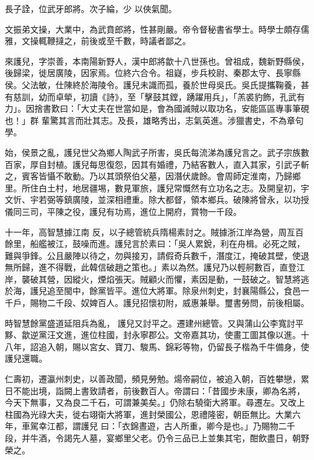 \begin{pinyinscope}
 長子詮，位武牙郎將。次子綸，少
 以俠氣聞。



 文振弟文操，大業中，為武賁郎將，性甚剛嚴。帝令督秘書省學士。時學士頗存儒雅，文操輒鞭撻之，前後或至千數，時議者鄙之。



 來護兒，字崇善，本南陽新野人，漢中郎將歙十八世孫也。曾祖成，魏新野縣侯，後歸梁，徙居廣陵，因家焉。位終六合令。祖嶷，步兵校尉、秦郡太守、長寧縣侯。父法敏，仕陳終於海陵令。護兒未識而孤，養於世母吳氏。吳氏提攜鞠養，甚有慈訓，幼而卓犖，初讀《詩》，至「擊鼓其鏜，踴躍用兵」，「羔裘豹飾，孔武有力」。因捨書歎曰：「大丈夫在世當如是，會為國滅賊以取功名，安能區區專事筆硯也！」群
 輩驚其言而壯其志。及長，雄略秀出，志氣英進。涉獵書史，不為章句學。



 始，侯景之亂，護兒世父為鄉人陶武子所害，吳氏每流涕為護兒言之。武子宗族數百家，厚自封植。護兒每思復怨，因其有婚禮，乃結客數人，直入其家，引武子斬之，賓客皆懾不敢動。乃以其頭祭伯父墓，因潛伏歲餘。會周師定淮南，乃歸鄉里。所住白土村，地居疆埸，數見軍旅，護兒常慨然有立功名之志。及開皇初，宇文忻、宇若弼等鎮廣陵，並深相禮重。除大都督，領本鄉兵。破陳將曾永，以功授儀同三司，平陳之役，護兒有功焉，進位上開府，賞物一千段。



 十一年，高智慧據江南
 反，以子總管統兵隋楊素討之。賊據浙江岸為營，周亙百餘里，船艦被江，鼓噪而進。護兒言於素曰：「吳人累銳，利在舟楫。必死之賊，難與爭鋒。公且嚴陣以待之，勿與接刃，請假奇兵數千，潛度江，掩破其壁，使退無所歸，進不得戰，此韓信破趙之策也。」素以為然。護兒乃以輕舸數百，直登江岸，襲破其營，因縱火，煙焰張天。賊顧火而懼，素因是動，一鼓破之。智慧將逃於海，護兒追至閩中，餘黨皆平。進位大將軍。除泉州刺史，封襄陽縣公，食邑一千戶，賜物二千段、奴婢百人。護兒招懷初附，威惠兼舉。璽書勞問，前後相屬。



 時智慧餘黨盛道延阻兵為亂，
 護兒又討平之。遷建州總管。又與蒲山公李寬討平黟、歙逆黨汪文進，進位柱國，封永寧郡公。文帝嘉其功，使畫工圖其像以進。十八年，詔追入朝，賜以宮女、寶刀、駿馬、錦彩等物，仍留長子楷為千牛備身，使護兒還職。



 仁壽初，遷瀛州刺史，以善政聞，頻見勞勉。煬帝嗣位，被追入朝，百姓攀戀，累日不能出境，詣闕上書致請者，前後數百人。帝謂曰：「昔國步未康，卿為名將，今天下無事，又為良二千石，可謂兼美矣。」仍除右驍衛大將軍。尋遷左。又改上柱國為光祿大夫，徙右翊衛大將軍，進封榮國公，恩禮隆密，朝臣無比。大業六年，車駕幸江都，謂護兒
 曰：「衣錦晝遊，古人所重，卿今是也。」乃賜物二千段，并牛酒，令謁先人墓，宴鄉里父老。仍令三品已上並集其宅，酣飲盡日，朝野榮之。




\end{pinyinscope}
